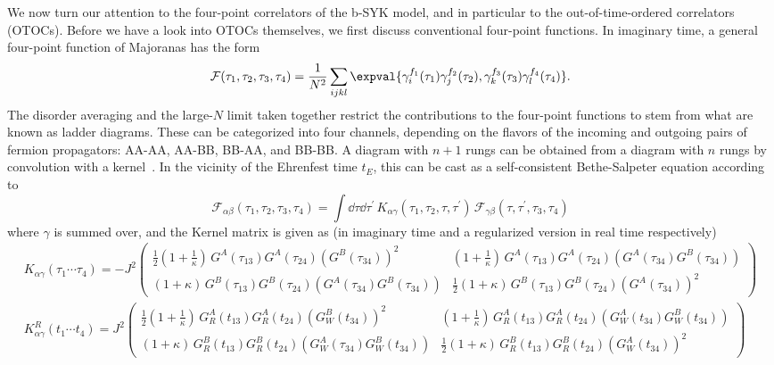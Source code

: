 We now turn our attention to the four-point correlators of the b-SYK model,
and in particular to the out-of-time-ordered correlators (OTOCs).
Before we have a look into OTOCs themselves, we first discuss conventional four-point functions. In imaginary time,
a general four-point function of Majoranas has the form~\cite{gross_generalization_2017} 
%
\begin{equation}\label{eq:fourpoint}
	\mathcal{F}(\tau_1,\tau_2,\tau_3,\tau_4) = \frac{1}{N^2}\sum_{ijkl}\expval{\gamma^{f_1}_i(\tau_1)\gamma^{f_2}_j(\tau_2),\gamma^{f_3}_k(\tau_3)\gamma^{f_4}_l(\tau_4)}.
\end{equation}
%
The disorder averaging and the large-$N$ limit taken together restrict the contributions to the four-point functions to stem from what are known as ladder diagrams. These can be categorized into four channels,
depending on the flavors of the incoming and outgoing pairs of fermion propagators: AA-AA, AA-BB, BB-AA, and BB-BB.
A diagram with $n+1$ rungs can be obtained from a diagram with $n$ rungs by convolution with a kernel~\cite{stanford_many-body_2016}. In the vicinity of the Ehrenfest time $t_E$,
this can be cast as a self-consistent Bethe-Salpeter equation according to
%
\begin{equation}
		\mathcal{F}_{\alpha\beta}(\tau_1,\tau_2,\tau_3,\tau_4) = \int \dd \tau \dd \tau^\prime \,K_{\alpha\gamma}(\tau_1,\tau_2,\tau,\tau^\prime)\, \mathcal{F}_{\gamma\beta}(\tau,\tau^\prime,\tau_3,\tau_4)
		\label{eq:kernelmatrixequation}
\end{equation}
	where $\gamma$ is summed over, and the Kernel matrix is given as (in imaginary time and a regularized version in real time respectively)
	\begin{align}
		K_{\alpha\gamma}(\tau_1\cdots \tau_4) = -J^2
		\begin{pmatrix}
			\frac{1}{2} (1+\frac{1}{\kappa})\,G^A(\tau_{13})G^A(\tau_{24})\left(G^B(\tau_{34})\right)^2   & (1+\frac{1}{\kappa})\,G^A(\tau_{13})G^A(\tau_{24})\left(G^A(\tau_{34})G^B(\tau_{34})\right) \\ 
			(1+\kappa) \,G^B(\tau_{13})G^B(\tau_{24})\left(G^A(\tau_{34})G^B(\tau_{34})\right) & \frac{1}{2} (1+\kappa)\, G^B(\tau_{13})G^B(\tau_{24})\left(G^A(\tau_{34})\right)^2
		\end{pmatrix} 
		\label{eq:kernel_tau} \\
		K^R_{\alpha\gamma}(t_1\cdots t_4) = J^2
		\begin{pmatrix}
			\frac{1}{2} (1+\frac{1}{\kappa})\,G^A_R(t_{13})G^A_R(t_{24})\left(G^B_W(t_{34})\right)^2   & (1+\frac{1}{\kappa})\,G^A_R(t_{13})G^A_R(t_{24})\left(G^A_W(t_{34})G^B_W(t_{34})\right) \\ 
			(1+\kappa) \,G^B_R(t_{13})G^B_R(t_{24})\left(G^A_W(\tau_{34})G^B_W(t_{34})\right) & \frac{1}{2} (1+\kappa)\, G^B_R(t_{13})G^B_R(t_{24})\left(G^A_W(t_{34})\right)^2
			\label{Kernelt}
		\end{pmatrix}
	\end{align}
